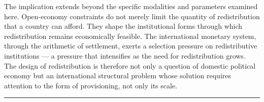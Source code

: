 \documentclass[preprint,review,12pt]{elsarticle}
\begin{document}
The implication extends beyond the specific modalities and parameters
examined here. Open-economy constraints do not merely limit the quantity
of redistribution that a country can afford. They shape the
institutional forms through which redistribution remains economically
feasible. The international monetary system, through the arithmetic of
settlement, exerts a selection pressure on redistributive institutions
--- a pressure that intensifies as the need for redistribution grows.
The design of redistribution is therefore not only a question of
domestic political economy but an international structural problem whose
solution requires attention to the form of provisioning, not only its
scale.

\begin{center}\rule{0.5\linewidth}{0.5pt}\end{center}
\end{document}
